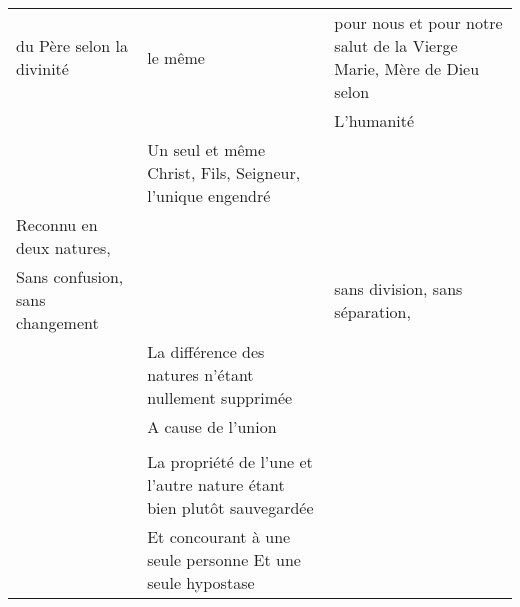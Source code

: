 \begin{table}[h!]
\begin{tabular}{p{}p{}p{}}
du Père selon la divinité                                              & le même                                                                                  & pour nous et pour notre salut de la Vierge Marie, Mère de Dieu selon \\
                                                                       &                                                                                          & L’humanité                                                           \\
\multicolumn{1}{l}{}                                                   & \multicolumn{1}{p{.3\textwidth}}{Un seul et même Christ, Fils, Seigneur, l’unique engendré}            & \multicolumn{1}{l}{}                                                 \\
Reconnu en deux natures,                                               &                                                                                          &                                                                      \\
Sans confusion, sans changement                                        &                                                                                          & sans division, sans séparation,                                      \\
                                                                       & La différence des natures n’étant nullement supprimée                                    &                                                                      \\
                                                                       & A cause de l’union                                                                       &                                                                      \\
                                                                       \\
                                                                       & La propriété de l’une et l’autre nature étant bien plutôt sauvegardée                    &                                                                      \\
                                                                       & Et concourant à une seule personne Et une seule hypostase                                &                                                                      \\

\end{tabular}
\end{table}
